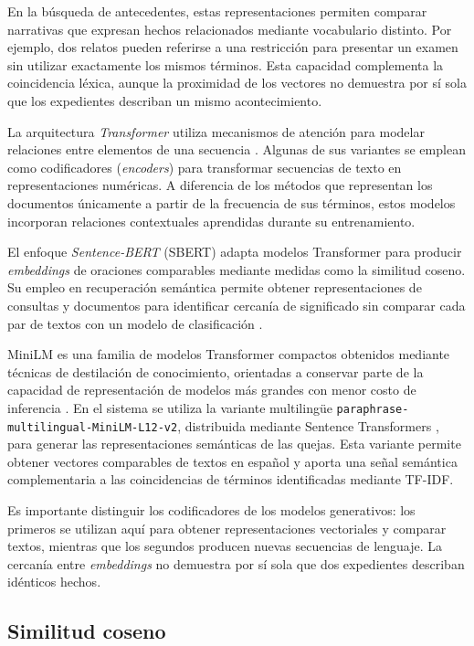 En la búsqueda de antecedentes, estas representaciones permiten comparar narrativas que expresan hechos relacionados mediante vocabulario distinto. Por ejemplo, dos relatos pueden referirse a una restricción para presentar un examen sin utilizar exactamente los mismos términos. Esta capacidad complementa la coincidencia léxica, aunque la proximidad de los vectores no demuestra por sí sola que los expedientes describan un mismo acontecimiento.

La arquitectura \textit{Transformer} utiliza mecanismos de atención para modelar relaciones entre elementos de una secuencia \cite{vaswani2017attention}. Algunas de sus variantes se emplean como codificadores
(\textit{encoders}) para transformar secuencias de texto en representaciones numéricas. A diferencia
de los métodos que representan los documentos únicamente a partir de la frecuencia de sus términos, estos modelos incorporan relaciones contextuales aprendidas durante su entrenamiento.

El enfoque \textit{Sentence-BERT} (SBERT) adapta modelos Transformer para producir
\textit{embeddings} de oraciones comparables mediante medidas como la similitud coseno. Su empleo
en recuperación semántica permite obtener representaciones de consultas y documentos para identificar cercanía de significado sin comparar cada par de textos con un modelo de clasificación
\cite{reimers2019sbert}.

MiniLM es una familia de modelos Transformer compactos obtenidos mediante técnicas de destilación de conocimiento, orientadas a conservar parte de la capacidad de representación de modelos más grandes con menor costo de inferencia \cite{wang2020minilm}. En el sistema se utiliza la variante multilingüe \texttt{paraphrase-multilingual-MiniLM-L12-v2}, distribuida mediante Sentence Transformers \cite{hf_minilm_multilingual}, para generar las representaciones semánticas de las quejas. Esta variante permite obtener vectores comparables de textos en español y aporta una señal semántica complementaria a las coincidencias de términos identificadas mediante TF-IDF.

Es importante distinguir los codificadores de los modelos generativos: los primeros se utilizan aquí para obtener representaciones vectoriales y comparar textos, mientras que los segundos producen nuevas secuencias de lenguaje. La cercanía entre \textit{embeddings} no demuestra por sí sola que dos expedientes describan idénticos hechos.

\subsection{Similitud coseno}

